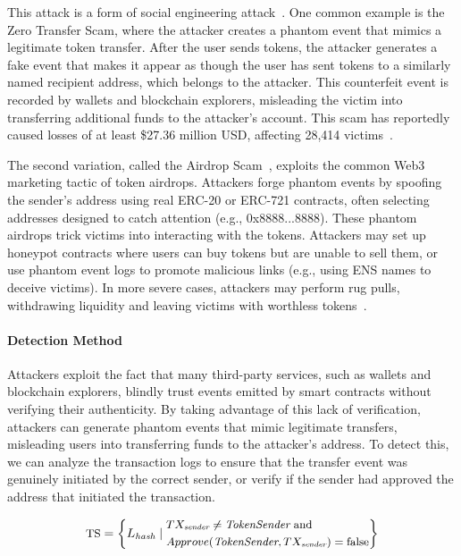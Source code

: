 This attack is a form of social engineering attack~\cite{social_engineer}. One common example is the Zero Transfer Scam, where the attacker creates a phantom event that mimics a legitimate token transfer. After the user sends tokens, the attacker generates a fake event that makes it appear as though the user has sent tokens to a similarly named recipient address, which belongs to the attacker. This counterfeit event is recorded by wallets and blockchain explorers, misleading the victim into transferring additional funds to the attacker's account. This scam has reportedly caused losses of at least \$27.36 million USD, affecting 28,414 victims~\cite{wallet_visual}.

The second variation, called the Airdrop Scam~\cite{spoof}, exploits the common Web3 marketing tactic of token airdrops. Attackers forge phantom events by spoofing the sender’s address using real ERC-20 or ERC-721 contracts, often selecting addresses designed to catch attention (e.g., 0x8888...8888). These phantom airdrops trick victims into interacting with the tokens. Attackers may set up honeypot contracts where users can buy tokens but are unable to sell them, or use phantom event logs to promote malicious links (e.g., using ENS names to deceive victims). In more severe cases, attackers may perform rug pulls, withdrawing liquidity and leaving victims with worthless tokens~\cite{rugpull}.


\paragraph{Detection Method}
Attackers exploit the fact that many third-party services, such as wallets and blockchain explorers, blindly trust events emitted by smart contracts without verifying their authenticity. By taking advantage of this lack of verification, attackers can generate phantom events that mimic legitimate transfers, misleading users into transferring funds to the attacker's address. To detect this, we can analyze the transaction logs to ensure that the transfer event was genuinely initiated by the correct sender, or verify if the sender had approved the address that initiated the transaction.


\begin{equation}
\small
\text{TS} = \left\{
L_{\textit{hash}} \mid
\begin{aligned}
  & TX_{\textit{sender}} \neq \textit{TokenSender} \text{ and } \\
  & Approve(\textit{TokenSender}, TX_{\textit{sender}}) = \text{false}
\end{aligned}
\right\}
\end{equation}


